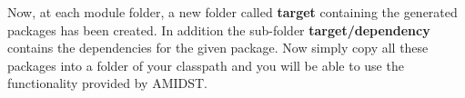 \documentclass[10pt,a4paper]{article}
\begin{document}
Now, at each module folder, a new folder called \textbf{target}
containing the generated packages has been created. In addition the
sub-folder {\textbf{target/dependency} }contains the dependencies for
the given package. Now simply copy all these packages into a folder of
your classpath and you will be able to use the functionality provided by
AMIDST.
\end{document}
